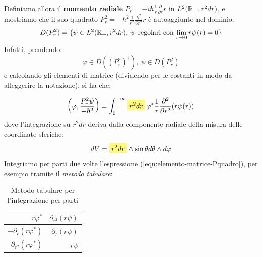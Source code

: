\documentclass[../../FisicaTeorica.tex]{subfiles}
\begin{document}
Definiamo allora il \textbf{momento radiale} $P_r = -i\hbar \frac{1}{r}\frac{\partial}{\partial r} r$ in $L^2(\mathbb{R}_+, r^2 dr)$, e mostriamo che il suo quadrato $P_r^2 = -\hbar^2 \frac{1}{r^2} \frac{\partial^2}{\partial r^2} r$ è autoaggiunto nel dominio:
\[
D(P_r^2) = \{
\psi \in L^2(\mathbb{R}_+, r^2 dr),\>\text{$\psi$ regolari con $\lim_{r\to 0} r\psi(r)=0$}
\}
\]
Infatti, prendendo:
\[
\varphi \in D((P^2_r)^\dag), \> \psi \in D(P_r^2)
\]
e calcolando gli elementi di matrice (dividendo per le costanti in modo da alleggerire la notazione), si ha che:

\begin{align}
\left(\varphi, \frac{P_r^2 \psi}{-\hbar^2}\right) = \int_0^{+\infty} \hlc{Yellow}{r^2 dr}\, \varphi^* \frac{1}{r} \frac{\partial^2}{\partial r^2} (r\psi(r))
\label{eqn:elemento-matrice-Pquadro}
\end{align}
dove l'integrazione su $r^2 dr$ deriva dalla componente radiale della misura delle coordinate sferiche:
\begin{align*}
dV =\hlc{Yellow}{r^2 dr} \land \sin\theta d\theta \land d\varphi
\end{align*}
Integriamo per parti due volte l'espressione (\ref{eqn:elemento-matrice-Pquadro}), per esempio tramite il \textit{metodo tabulare}:
\begin{table}[H]
\centering
\begin{tabular}{@{}rr@{}}
\toprule
$r\varphi^*$ & $\partial_{r^2}(r\psi)$\\ \midrule
$-\partial_r (r\varphi^*)$ & $\partial_r (r\psi)$\\
$\partial_{r^2}(r\varphi^*)$ & $r\psi$\\
\bottomrule
\end{tabular}
\caption{Metodo tabulare per l'integrazione per parti}
\end{table}
\end{document}
